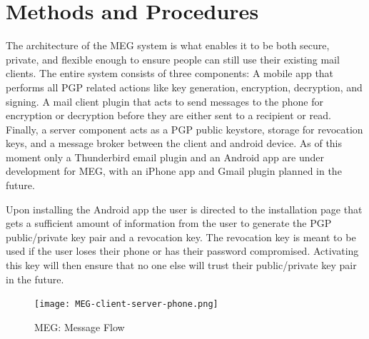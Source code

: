 \documentclass[11pt]{article}
\begin{document}
\section{Methods and Procedures}
\par The architecture of the MEG system is what enables it to be both secure, private, and flexible enough to ensure people can still use their existing mail clients. The entire system consists of three components: A mobile app that performs all PGP related actions like key generation, encryption, decryption, and signing. A mail client plugin that acts to send messages to the phone for encryption or decryption before they are either sent to a recipient or read. Finally, a server component acts as a PGP public keystore, storage for revocation keys, and a message broker between the client and android device. As of this moment only a Thunderbird email plugin and an Android app are under development for MEG, with an iPhone app and Gmail plugin planned in the future.
\par Upon installing the Android app the user is directed to the installation page that gets a sufficient amount of information from the user to generate the PGP public/private key pair and a revocation key. The revocation key is meant to be used if the user loses their phone or has their password compromised. Activating this key will then ensure that no one else will trust their public/private key pair in the future.

\begin{figure}[h]
    \texttt{[image: MEG-client-server-phone.png]}
    \caption{MEG: Message Flow}
    \label{fig:Flow}
\end{figure}
\end{document}
